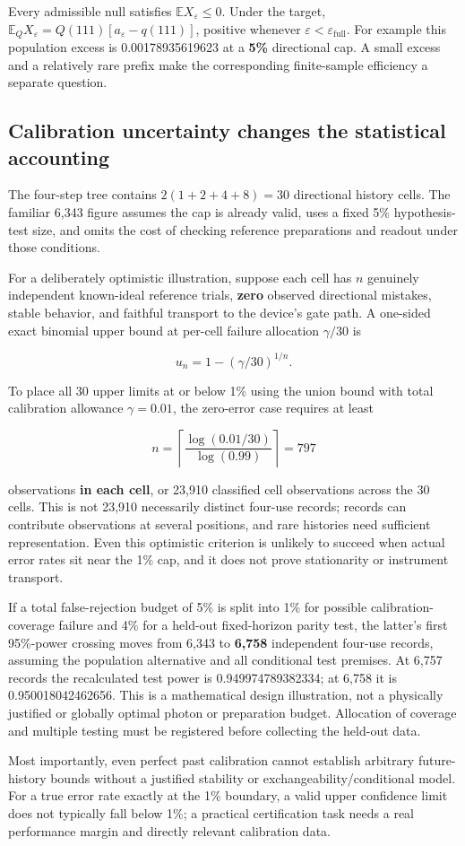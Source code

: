 \documentclass[
  10pt,
  a4paper,
]{article}
\begin{document}
Every admissible null satisfies \(\mathbb E X_\varepsilon\leq0\). Under the target, \(\mathbb E_Q X_\varepsilon=Q(111)[a_\varepsilon-q(111)]\), positive whenever \(\varepsilon<\varepsilon_{\mathrm{full}}\). For example this population excess is 0.00178935619623 at a \textbf{5\%} directional cap. A small excess and a relatively rare prefix make the corresponding finite-sample efficiency a separate question.

\subsection{Calibration uncertainty changes the statistical accounting}\label{calibration-uncertainty-changes-the-statistical-accounting}

The four-step tree contains \(2(1+2+4+8)=30\) directional history cells. The familiar 6,343 figure assumes the cap is already valid, uses a fixed 5\% hypothesis-test size, and omits the cost of checking reference preparations and readout under those conditions.

For a deliberately optimistic illustration, suppose each cell has \(n\) genuinely independent known-ideal reference trials, \textbf{zero} observed directional mistakes, stable behavior, and faithful transport to the device's gate path. A one-sided exact binomial upper bound at per-cell failure allocation \(\gamma/30\) is

\[
 u_n=1-(\gamma/30)^{1/n}.
\]

To place all 30 upper limits at or below 1\% using the union bound with total calibration allowance \(\gamma=0.01\), the zero-error case requires at least

\[
 n=\left\lceil\frac{\log(0.01/30)}{\log(0.99)}\right\rceil=797
\]

observations \textbf{in each cell}, or 23,910 classified cell observations across the 30 cells. This is not 23,910 necessarily distinct four-use records; records can contribute observations at several positions, and rare histories need sufficient representation. Even this optimistic criterion is unlikely to succeed when actual error rates sit near the 1\% cap, and it does not prove stationarity or instrument transport.

If a total false-rejection budget of 5\% is split into 1\% for possible calibration-coverage failure and 4\% for a held-out fixed-horizon parity test, the latter's first 95\%-power crossing moves from 6,343 to \textbf{6,758} independent four-use records, assuming the population alternative and all conditional test premises. At 6,757 records the recalculated test power is 0.949974789382334; at 6,758 it is 0.950018042462656. This is a mathematical design illustration, not a physically justified or globally optimal photon or preparation budget. Allocation of coverage and multiple testing must be registered before collecting the held-out data.

Most importantly, even perfect past calibration cannot establish arbitrary future-history bounds without a justified stability or exchangeability/conditional model. For a true error rate exactly at the 1\% boundary, a valid upper confidence limit does not typically fall below 1\%; a practical certification task needs a real performance margin and directly relevant calibration data.
\end{document}
